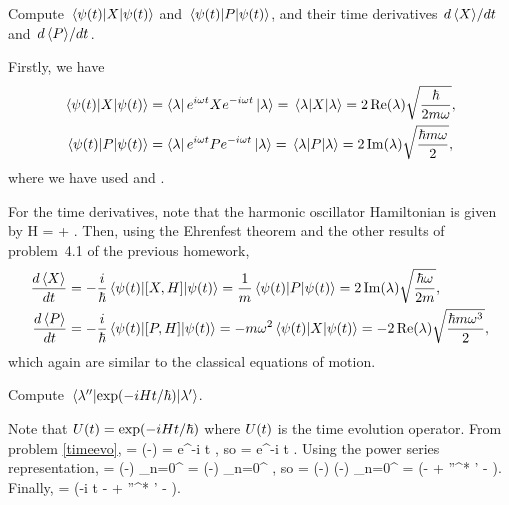 \begin{problem}
	Compute $\ev{X}{\psit}$ and $\ev{P}{\psit}$, and their time derivatives $\dv*{\ev{X}}{t}$ and $\dv*{\ev{P}}{t}$.
\end{problem}

\begin{solution}
	Firstly, we have
	\begin{align*}
		\ev{X}{\psit} &= \blam e^{i \omega t} X e^{-i \omega t} \klam = \ev{X}{\lam} = 2 \Re(\lam) \sqrt{\frac{\hbar}{2 m \omega}}, \\
		\ev{P}{\psit} &= \blam e^{i \omega t} P e^{-i \omega t} \klam = \ev{P}{\lam} = 2 \Im(\lam) \sqrt{\frac{\hbar m \omega}{2}},
	\end{align*}
	where we have used  and .
	
	For the time derivatives, note that the harmonic oscillator Hamiltonian is given by
	\beq
		H =  + .
	\eeq
	Then, using the Ehrenfest theorem and the other results of problem~4.1 of the previous homework,
	\begin{align*}
		\dv{\ev{X}}{t} &= -\frac{i}{\hbar} \ev{[X, H]}{\psit} = \frac{1}{m} \ev{P}{\psit} = 2 \Im(\lam) \sqrt{\frac{\hbar \omega}{2 m}}, \\
		\dv{\ev{P}}{t} &= -\frac{i}{\hbar} \ev{[P, H]}{\psit} = - m \omega^2 \ev{X}{\psit} = -2 \Re(\lam) \sqrt{\frac{\hbar m \omega^3}{2}},
	\end{align*}
	which again are similar to the classical equations of motion.
\end{solution}

\newcommand{\klamp}{\ket{\lam'}}
\newcommand{\bkll}{\braket*{\lam''}{\lam'}}

\begin{problem}
	Compute $\mel*{\lambda''}{\exp(-i H t / \hbar)}{\lambda'}$.
\end{problem}

\begin{solution}
	Note that $U(t) = \exp(-i H t / \hbar)$ where $U(t)$ is the time evolution operator.  From problem \ref{timeevo},
	\beq
		\kpsit = \Ut \klam \implies \exp(-) \klamp = e^{-i \omega t} \klamp,
	\eeq
	so
	\beq
		 = e^{-i \omega t} \bkll.
	\eeq
	Using the power series representation,
	\beq
		\klam = \exp(-) \sum_{n=0}^\infty {} \ko = \exp(-) \sum_{n=0}^\infty {} \kn,
	\eeq
	so
	\beq
		\bkll = \exp(-) \exp(-) \sum_{n=0}^\infty {}  = \exp(- + {\lam''}^* \lam' - ).
	\eeq
	Finally,
	\beq
		 = \exp(-i \omega t -  + {\lam''}^* \lam' - ).
	\eeq
\end{solution}